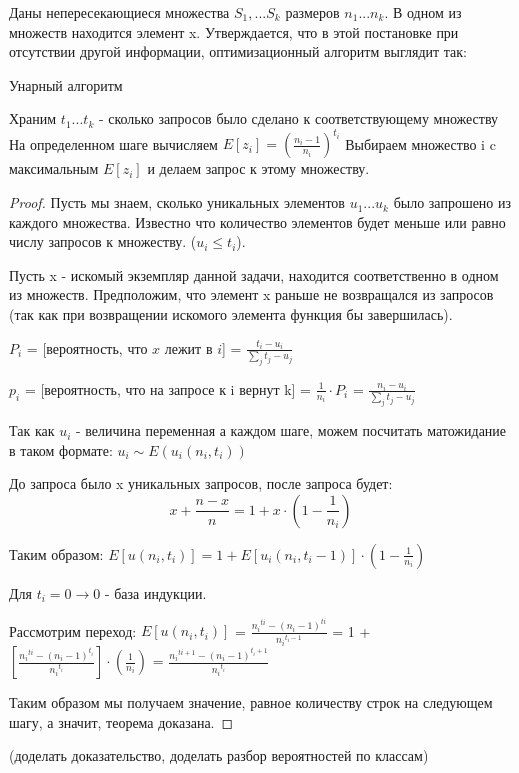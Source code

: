 \newtheorem{theorem}{Теорема}
\begin{myth}
Даны непересекающиеся множества $S_1, ... S_k$ размеров $n_1 ... n_k$.
В одном из множеств находится элемент x. Утверждается, что в этой постановке при отсутствии другой информации, оптимизационный алгоритм выглядит так: 
\begin{algorithm}[H]
\caption{Унарный алгоритм}\label{lst1}
\begin{algorithmic}
	    \State Храним $t_1 ... t_k$ - сколько запросов было сделано к соответствующему множеству
	    \State На определенном шаге вычисляем $E[z_i] = (\frac{n_i - 1}{n_i})^{t_i}$
	    \State Выбираем множество i c максимальным $E[z_i]$ и делаем запрос к этому множеству.
	    \EndFor
\end{algorithmic}
\end{algorithm}
\end{myth}
\begin{proof}
    Пусть мы знаем, сколько уникальных элементов $u_1...u_k$ было запрошено из каждого множества. Известно что количество элементов будет меньше или равно числу запросов к множеству. ($u_i \leq t_i$). 
    
    Пусть x - искомый экземпляр данной задачи, находится соответственно в одном из множеств. Предположим, что элемент x раньше не возвращался из запросов (так как при возвращении искомого элемента функция бы завершилась).
    
    
    $P_i$ = [вероятность, что $x$ лежит в $i$] = $\frac{t_i - u_i}{\sum_{j}{t_j - u_j}}$ 
    
    $p_i$ = [вероятность, что на запросе к i вернут k] = $\frac{1}{n_i} \cdot P_i$ = $\frac{n_i - u_i}{\sum_{j}{t_j - u_j}}$
    
    Так как $u_i$ - величина переменная а каждом шаге, можем посчитать матожидание в таком формате: $u_i \sim E(u_i(n_i, t_i))$
    
    До запроса было x уникальных запросов, после запроса будет: $$x + \frac{n - x}{n} = 1 + x \cdot (1 - \frac{1}{n_i})$$ 
    
    Таким образом: $E[u(n_i, t_i)] = 1 + E[u_i(n_i, t_{i} - 1)] \cdot (1 - \frac{1}{n_i})$
    
    Для $ t_i = 0 \to 0 $ - база индукции.
    
    Рассмотрим переход: 
    $E[u(n_i, t_i)]$ = $\frac{{n_i}^{ti} - {(n_i - 1)}^{ti}}{{n_i}^{t_i - 1}}$  = 1 + $[ \frac{{n_i}^{ti} - {(n_i - 1)}^{t_i}}{{n_i}^{t_i}} ] \cdot (\frac{1}{n_i})$ = $ \frac{{n_i}^{ti + 1} - {(n_i - 1)}^{t_i + 1}}{{n_i}^{t_i}} $ 
    
    Таким образом мы получаем значение, равное количеству строк на следующем шагу, а значит, теорема доказана.

\end{proof}


(доделать доказательство, доделать разбор вероятностей по классам)
